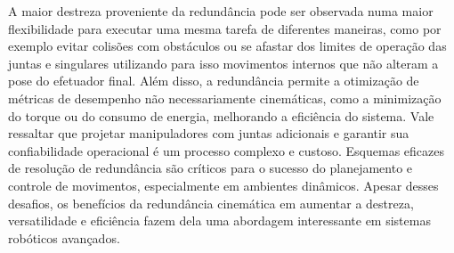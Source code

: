 A maior destreza proveniente da redundância pode ser observada numa maior flexibilidade para executar uma mesma tarefa de
diferentes maneiras, como por exemplo evitar colisões com obstáculos ou se afastar dos limites de operação das juntas e singulares
utilizando para isso movimentos internos que não alteram a pose do efetuador final. Além disso, a redundância permite a otimização
de métricas de desempenho não necessariamente cinemáticas, como a minimização do torque ou do consumo de energia, melhorando a
eficiência do sistema. Vale ressaltar que projetar manipuladores com juntas adicionais e garantir sua confiabilidade operacional é um
processo complexo e custoso. Esquemas eficazes de resolução de redundância são críticos para o sucesso do planejamento e controle de movimentos,
especialmente em ambientes dinâmicos. Apesar desses desafios, os benefícios da redundância cinemática em aumentar a destreza, versatilidade e eficiência
fazem dela uma abordagem interessante em sistemas robóticos avançados.



